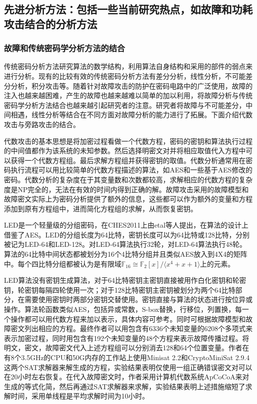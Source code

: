 \documentclass[a4paper,12pt]{article}
\begin{document}
\begin{CJK}{UTF8}{gkai}
\subsection{先进分析方法：包括一些当前研究热点，如故障和功耗攻击结合的分析方法}
\subsubsection{故障和传统密码学分析方法的结合}

传统密码分析方法研究算法的数学结构，利用算法自身结构和采用的部件的弱点来进行分析。现有的比较有效的传统密码分析方法有差分分析，线性分析，不可能差分分析，积分攻击等。随着针对故障攻击的防护在密码电路中的广泛使用，故障的注入也越来越困难，产生的故障也越来越难以简单的加以利用，将故障分析与传统密码学分析方法结合也越来越引起研究者的注意。研究者将故障与不可能差分，中间相遇，线性分析等结合在不同方面对故障分析的能力进行了拓展。下面介绍代数攻击与旁路攻击的结合。

代数攻击的基本思想是将加密过程看做一个代数方程，密码的密钥和算法执行过程的中间值都作为该系统的未知参数。然后选择明密文对并将相应取值代入方程中可以获得一个代数方程组。最后求解方程组并获得密钥的取值。代数分析通常用在密码执行流程可以用比较简单的代数方程描述的算法，如AES和一些基于AES修改的密码。代数分析的复杂度在于其变量数和次数都较高，求解相应的代数方程的复杂度是NP完全的，无法在有效的时间内得到正确的解。故障攻击采用的故障模型和故障密文实际上为密码分析提供了额外的信息，这些都可以作为额外的变量和方程添加到原有方程组中，进而简化方程组的求解，从而恢复密钥。

LED是一个轻量级的分组密码，在CHES2011上由etal等人提出，在算法的设计上借鉴了AES。LED的分组长度为64比特，密钥长度可以为64比特或128比特，分别被记为LED-64和LED-128。对LED-64算法执行32轮，对LED-64算法执行48轮。算法的64比特中间状态都被划分为16个4比特分组并且类似AES放入到4X4的矩阵中。每个四比特分组都被认为是有限域$\mathbb{F}_{16}\cong \mathbb{F}_{2}[x]/\langle x^{4}+x+1 \rangle$上的元素。

LED算法没有密钥生成算法，对于64比特密钥主密钥直接被用作白化密钥和轮密钥，轮密钥每隔四轮使用一次；对于128比特密钥主密钥被划分为两个64比特部分，在需要使用密钥时两部分密钥交替使用。密钥直接与算法的状态进行按位异或操作。算法轮函数类似AES，包括异或常数，S-box替换，行移位，列置换，每一个操作都可以用代数方程来加以表示，具体内容可参考。同时可根据故障模型和故障密文列出相应的方程。最终作者可以用包含有6336个未知变量的6208个多项式来表示加密过程，同时用包含有192个未知变量的48个方程来表示故障传播过程。将明文，密文，故障密文代入上述方程组可以分别消去128和64个位置变量。作者在有8个3.5GHz的CPU和50G内存的工作站上使用Minisat 2.2和CryptoMiniSat 2.9.4这两个SAT求解器来解生成的方程，实验结果表明仅使用一组正确错误密文对可以在20小时左右恢复。在代入故障密文时，作者采用计算机代数系统ApCoCoA来对生成的等式化简，然后再通过SAT求解器来求解，实验结果表明上述措施缩短了求解时间，采用单线程是平均求解时间为10小时。


\end{CJK}
\end{document}
